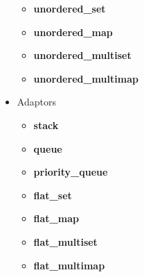\documentclass{article}
\begin{document}
\begin{itemize}
	      \begin{itemize}
		      \item \textbf{unordered\_set}
		      \item \textbf{unordered\_map}
		      \item \textbf{unordered\_multiset}
		      \item \textbf{unordered\_multimap}
	      \end{itemize}
	\item Adaptors
	      \begin{itemize}
		      \item \textbf{stack}
		      \item \textbf{queue}
		      \item \textbf{priority\_queue}
		      \item \textbf{flat\_set}
		      \item \textbf{flat\_map}
		      \item \textbf{flat\_multiset}
		      \item \textbf{flat\_multimap}
	      \end{itemize}
\end{itemize}
\end{document}
